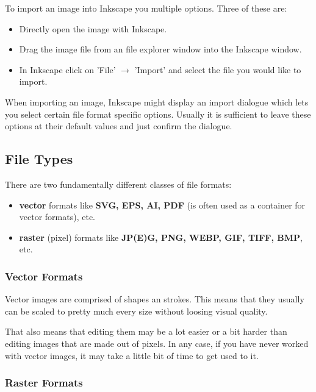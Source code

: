 \documentclass{article}
\begin{document}
            To import an image into Inkscape you multiple options. Three of these are:

            \begin{itemize}
                \item Directly open the image with Inkscape.
                \item Drag the image file from an file explorer window into the Inkscape window.
                \item In Inkscape click on 'File' $\rightarrow$ 'Import' and select the file you would like to import.
            \end{itemize}

            When importing an image, Inkscape might display an import dialogue which lets you select certain file format specific options.
            Usually it is sufficient to leave these options at their default values and just confirm the dialogue.

        \subsection{File Types}

            There are two fundamentally different classes of file formats:
            \begin{itemize}
                \item \textbf{vector} formats like \textbf{SVG, EPS, AI, PDF} (is often used as a container for vector formats), etc.
                \item \textbf{raster} (pixel) formats like \textbf{JP(E)G, PNG, WEBP, GIF, TIFF, BMP}, etc.
            \end{itemize}

            \subsubsection{Vector Formats}

                Vector images are comprised of shapes an strokes.
                This means that they usually can be scaled to pretty much every size without loosing visual quality.

                That also means that editing them may be a lot easier or a bit harder than editing images that are made out of pixels.
                In any case, if you have never worked with vector images, it may take a little bit of time to get used to it.

            \subsubsection{Raster Formats}
\end{document}
